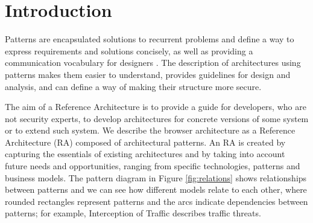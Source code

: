 \documentclass[prodmode,acmtecs]{acmsmall}
\begin{document}
%
%






\maketitle
\section{Introduction}
Patterns are encapsulated solutions to recurrent problems and define a way to express requirements and solutions concisely, as well as providing a communication vocabulary for designers \cite{gamma1994design,buschman1996system}. The description of architectures using patterns makes them easier to understand, provides guidelines for design and analysis, and can define a way of making their structure more secure.

The aim of a Reference Architecture is to provide a guide for developers, who are not security experts, to develop architectures for concrete versions of some system or to extend such system. We describe the browser architecture as a Reference Architecture (RA) composed  of architectural patterns. An RA is created by capturing the essentials of existing architectures and by taking into account future needs and opportunities, ranging from specific technologies, patterns and business models. The pattern diagram \cite{buschman1996system} in Figure \ref{fig:relations} shows relationships between patterns and we can see how different models relate to each other, where rounded rectangles represent patterns and the arcs indicate dependencies between patterns; for example, Interception of Traffic describes traffic threats.
\end{document}

